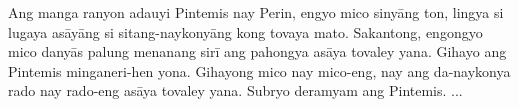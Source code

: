 \documentclass[12pt,paper=a4]{scrartcl}
\begin{document}
\noindent Ang manga ranyon adauyi Pintemis nay Perin, engyo mico sinyāng ton, lingya si lugaya asāyāng si sitang-naykonyāng kong tovaya mato.
Sakantong, engongyo mico danyās palung menanang sirī ang pahongya asāya tovaley yana.
Gihayo ang Pintemis minganeri-hen yona.
Gihayong mico nay mico-eng, nay ang da-naykonya rado nay rado-eng asāya tovaley yana.
Subryo deramyam ang Pintemis.
...



\begin{multicols}{3}
\printglossary[style=mysuper,type=\leipzigtype]
\end{multicols}

\printbibliography[heading=bibintoc]
\end{document}
